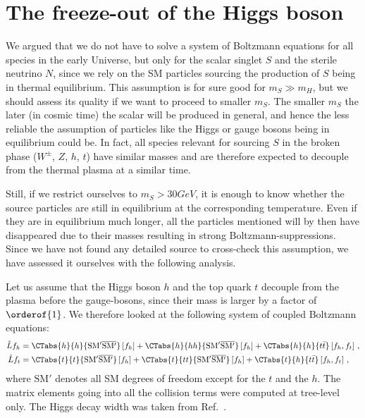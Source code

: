 \section{\label{app:B:Higgs-FO}The freeze-out of the Higgs boson}
\renewcommand{\theequation}{B-\arabic{equation}}
\setcounter{equation}{0}  %

We argued that we do not have to solve a system of Boltzmann equations for all species in the early Universe, but only for the scalar singlet $S$ and the sterile neutrino $N$, since we rely on the SM particles sourcing the production of $S$ being in thermal equilibrium. This assumption is for sure good for $m_S \gg m_H$, but we should assess its quality if we want to proceed to smaller $m_S$. The smaller $m_S$ the later (in cosmic time) the scalar will be produced in general, and hence the less reliable the assumption of particles like the Higgs or gauge bosons being in equilibrium could be. In fact, all species relevant for sourcing $S$ in the broken phase ($W^\pm$, $Z$, $h$, $t$) have similar masses and are therefore expected to decouple from the thermal plasma at a similar time.

Still, if we restrict ourselves to $m_S > \unit{30}{GeV}$, it is enough to know whether the source particles are still in equilibrium at the corresponding temperature. Even if they are in equilibrium much longer, all the particles mentioned will by then have disappeared due to their masses resulting in strong Boltzmann-suppressions. Since we have not found any detailed source to cross-check this assumption, we have assessed it ourselves with the following analysis.

Let us assume that the Higgs boson $h$ and the top quark $t$ decouple from the plasma before the gauge-bosons, since their mass is larger by a factor of $\orderof{1}$.
We therefore looked at the following system of coupled Boltzmann equations:
\begin{align}
 \hat{L} f_h  &= \CTabs{h}{h}{\mathrm{SM'}\overline{\mathrm{SM'}}}\left[f_h\right]
  + \CTabs{h}{hh}{\mathrm{SM'}\overline{\mathrm{SM'}}}\left[f_h\right]
  + \CTabs{h}{h}{t\bar{t}}\left[f_h,f_t\right] \, , \nonumber \\
  \hat{L} f_t &= \CTabs{t}{t}{\mathrm{SM'}\overline{\mathrm{SM'}}}\left[f_h\right]
  + \CTabs{t}{tt}{\mathrm{SM'}\overline{\mathrm{SM'}}}\left[f_h\right]
  + \CTabs{t}{h}{t\bar{t}}\left[f_h,f_t\right] \, ,
\end{align}
where $\mathrm{SM'}$ denotes all SM degrees of freedom except for the $t$ and the $h$. The matrix elements going into all the collision terms were computed at tree-level only. The Higgs decay width was taken from Ref.~\cite{Agashe:2014kda}.

